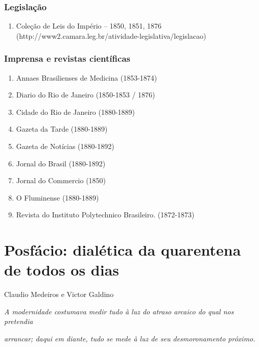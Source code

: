 \hypertarget{legislauxe7uxe3o}{%
\subsection{Legislação}\label{legislauxe7uxe3o}}

\begin{enumerate}
\def\labelenumi{\arabic{enumi}.}
\tightlist
\item
  Coleção de Leis do Império -- 1850, 1851, 1876
  (http://www2.camara.leg.br/atividade-legislativa/legislacao)
\end{enumerate}

\hypertarget{imprensa-e-revistas-cientuxedficas}{%
\subsection{Imprensa e revistas
científicas}\label{imprensa-e-revistas-cientuxedficas}}

\begin{enumerate}
\def\labelenumi{\arabic{enumi}.}
\item
  Annaes Brasilienses de Medicina (1853-1874)
\item
  Diario do Rio de Janeiro (1850-1853 / 1876)
\item
  Cidade do Rio de Janeiro (1880-1889)
\item
  Gazeta da Tarde (1880-1889)
\item
  Gazeta de Notícias (1880-1892)
\item
  Jornal do Brasil (1880-1892)
\item
  Jornal do Commercio (1850)
\item
  O Fluminense (1880-1889)
\item
  Revista do Instituto Polytechnico Brasileiro. (1872-1873)
\end{enumerate}

\hypertarget{posfuxe1cio-dialuxe9tica-da-quarentena-de-todos-os-dias}{%
\chapter{Posfácio: dialética da quarentena de todos os
dias}\label{posfuxe1cio-dialuxe9tica-da-quarentena-de-todos-os-dias}}

Claudio Medeiros e Victor Galdino

\emph{A modernidade costumava medir tudo à luz do atraso arcaico do qual
nos pretendia~}

\emph{arrancar; daqui em diante, tudo se mede à luz de seu
desmoronamento próximo.}

